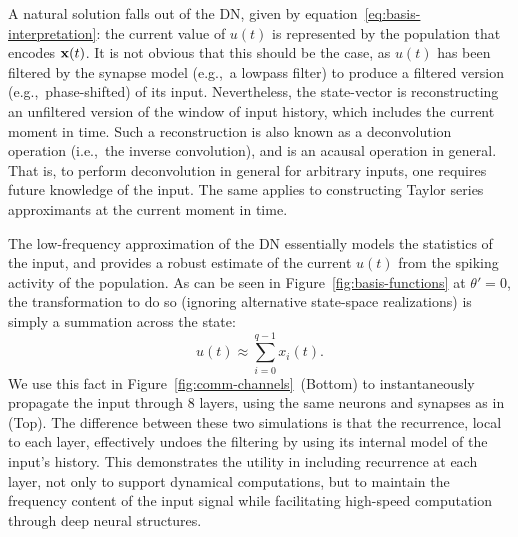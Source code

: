 
A natural solution falls out of the DN, given by equation~\ref{eq:basis-interpretation}: the current value of $u(t)$ is represented by the population that encodes $\mathbf{x}(t)$.
It is not obvious that this should be the case, as $u(t)$ has been filtered by the synapse model (e.g.,~a lowpass filter) to produce a filtered version (e.g.,~phase-shifted) of its input.
Nevertheless, the state-vector is reconstructing an unfiltered version of the window of input history, which includes the current moment in time.
Such a reconstruction is also known as a deconvolution operation (i.e.,~the inverse convolution), and is an acausal operation in general.
That is, to perform deconvolution in general for arbitrary inputs, one requires future knowledge of the input.
The same applies to constructing Taylor series approximants at the current moment in time.

The low-frequency approximation of the DN essentially models the statistics of the input, and provides a robust estimate of the current $u(t)$ from the spiking activity of the population.
As can be seen in Figure~\ref{fig:basis-functions} at $\theta' = 0$, the transformation to do so (ignoring alternative state-space realizations) is simply a summation across the state:
\begin{equation}
u(t) \approx \sum_{i=0}^{q-1} x_i(t) \text{.}
\end{equation}
We use this fact in Figure~\ref{fig:comm-channels}~(Bottom) to instantaneously propagate the input through 8 layers, using the same neurons and synapses as in (Top).
The difference between these two simulations is that the recurrence, local to each layer, effectively undoes the filtering by using its internal model of the input's history.
This demonstrates the utility in including recurrence at each layer, not only to support dynamical computations, but to maintain the frequency content of the input signal while facilitating high-speed computation through deep neural structures.



